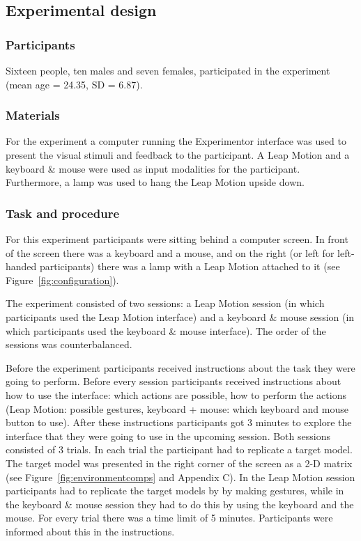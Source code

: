 \subsection{Experimental design}
\subsubsection{Participants}
Sixteen people, ten males and seven females, participated in the experiment (mean age = 24.35, SD = 6.87). 
\subsubsection{Materials}
For the experiment a computer running the Experimentor interface was used to present the visual stimuli and feedback to the participant. A Leap Motion and a keyboard \& mouse
 were used as input modalities for the participant. Furthermore, a lamp was used to hang the Leap Motion upside down.
\subsubsection{Task and procedure}
For this experiment participants were sitting behind a computer screen. In front of the screen there was a keyboard and a mouse, and on the right (or left for left-handed 
participants) there was a lamp with a Leap Motion attached to it (see Figure~\ref{fig:configuration}).

The experiment consisted of two sessions: a Leap Motion session (in which participants used the Leap Motion interface) and a keyboard \& mouse session (in which participants 
used the keyboard \& mouse interface). The order of the sessions was counterbalanced.

Before the experiment participants received instructions about the task they were going to perform. Before every session participants received instructions about how to use 
the interface: which actions are possible, how to perform the actions (Leap Motion: possible gestures, keyboard + mouse: which keyboard and mouse button to use). After these 
instructions participants got 3 minutes to explore the interface that they were going to use in the upcoming session. 
Both sessions consisted of 3 trials. In each trial the participant had to replicate a target model. The target model was presented in the right corner of the screen as a 2-D
 matrix (see Figure~\ref{fig:environmentcomps} and Appendix C). In the Leap Motion session participants had to replicate the target models by by making gestures, while in the 
 keyboard \& mouse session they had to do this by using the keyboard and the mouse. For every trial there was a time limit of 5 minutes. Participants were informed about 
 this in the instructions.

